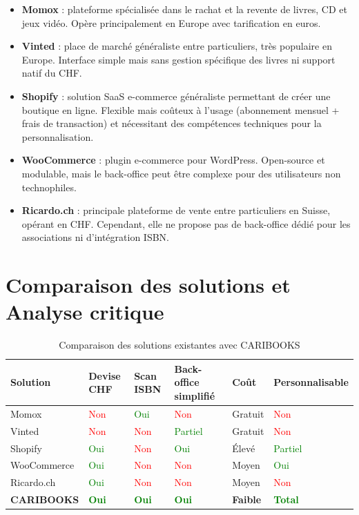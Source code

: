 \documentclass[12pt, a4paper]{report}
\renewcommand{\_}{\origunderscore\allowbreak}
\begin{document}
\begin{itemize}
    \item \textbf{Momox} : plateforme spécialisée dans le rachat et la revente de livres, CD et jeux vidéo. Opère principalement en Europe avec tarification en euros.
    \item \textbf{Vinted} : place de marché généraliste entre particuliers, très populaire en Europe. Interface simple mais sans gestion spécifique des livres ni support natif du CHF.
    \item \textbf{Shopify} : solution SaaS e-commerce généraliste permettant de créer une boutique en ligne. Flexible mais coûteux à l'usage (abonnement mensuel + frais de transaction) et nécessitant des compétences techniques pour la personnalisation.
    \item \textbf{WooCommerce} : plugin e-commerce pour WordPress. Open-source et modulable, mais le back-office peut être complexe pour des utilisateurs non technophiles.
    \item \textbf{Ricardo.ch} : principale plateforme de vente entre particuliers en Suisse, opérant en CHF. Cependant, elle ne propose pas de back-office dédié pour les associations ni d'intégration ISBN.
\end{itemize}

\section{Comparaison des solutions et Analyse critique}

\begin{table}[h]
\centering
\renewcommand{\arraystretch}{1.4}
\begin{tabular}{@{}p{2.8cm}p{1.8cm}p{2cm}p{2cm}p{2cm}p{2.5cm}@{}}
\toprule
\textbf{Solution} & \textbf{Devise CHF} & \textbf{Scan ISBN} & \textbf{Back-office simplifié} & \textbf{Coût} & \textbf{Personnalis\-able} \\
\midrule
Momox & \textcolor{red}{Non} & \textcolor{green}{Oui} & \textcolor{red}{Non} & Gratuit & \textcolor{red}{Non} \\
Vinted & \textcolor{red}{Non} & \textcolor{red}{Non} & \textcolor{green}{Partiel} & Gratuit & \textcolor{red}{Non} \\
Shopify & \textcolor{green}{Oui} & \textcolor{red}{Non} & \textcolor{green}{Oui} & Élevé & \textcolor{green}{Partiel} \\
WooCommerce & \textcolor{green}{Oui} & \textcolor{red}{Non} & \textcolor{red}{Non} & Moyen & \textcolor{green}{Oui} \\
Ricardo.ch & \textcolor{green}{Oui} & \textcolor{red}{Non} & \textcolor{red}{Non} & Moyen & \textcolor{red}{Non} \\
\textbf{CARIBOOKS} & \textcolor{green}{\textbf{Oui}} & \textcolor{green}{\textbf{Oui}} & \textcolor{green}{\textbf{Oui}} & \textbf{Faible} & \textcolor{green}{\textbf{Total}} \\
\bottomrule
\end{tabular}
\caption{Comparaison des solutions existantes avec CARIBOOKS}
\label{tab:comparaison}
\end{table}
\end{document}
